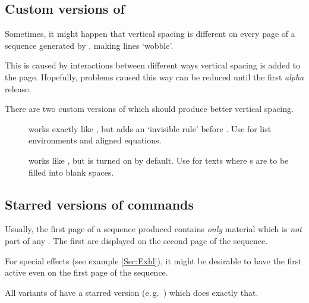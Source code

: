 \documentclass[12pt]{scrartcl}
\let\newslide=\relax
\begin{document}
  \newslide

  \subsection{Custom versions of }%
  Sometimes, it might happen that vertical spacing is different on every page of a sequence generated by
  , making lines `wobble'.

  This is caused by interactions between different ways vertical spacing is added to the page. Hopefully, problems
  caused this way can be reduced until the first \emph{alpha} release.

  \newslide

  There are two custom versions of  which should produce better vertical spacing.
  \begin{description}
  \item[]
     works exactly like , but adds
    an `invisible rule' before . Use for list environments and
    aligned equations.
  \item[]
     works like , but
     is turned on by default. Use for texts where
    s are to be filled into blank spaces.
  \end{description}

  \newslide

  \subsection{Starred versions of  commands}\label{Sec:StarredStepwise}%
  Usually, the first page of a sequence produced contains \emph{only} material which is \emph{not} part of any
  . The first  are displayed on the second page of the sequence.

  For special effects (see example \ref{Sec:Exhl}), it might be desirable to have the first  active
  even on the first page of the sequence.

  All variants of   have a starred version (e.\,g.\ ) which does exactly that.

  \newslide
\end{document}
